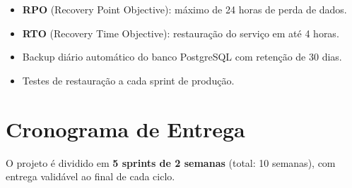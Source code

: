 \documentclass[12pt,a4paper]{article}
\begin{document}
\begin{itemize}[leftmargin=1.5em]
  \item \textbf{RPO} (Recovery Point Objective): máximo de 24 horas de perda de dados.
  \item \textbf{RTO} (Recovery Time Objective): restauração do serviço em até 4 horas.
  \item Backup diário automático do banco PostgreSQL com retenção de 30 dias.
  \item Testes de restauração a cada sprint de produção.
\end{itemize}

\section{Cronograma de Entrega}

O projeto é dividido em \textbf{5 sprints de 2 semanas} (total: 10 semanas), com entrega
validável ao final de cada ciclo.
\end{document}

